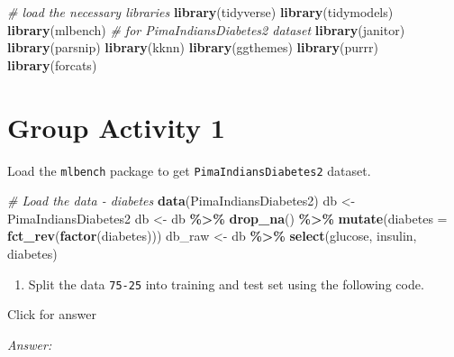 \documentclass[
]{book}
\newenvironment{Shaded}{\begin{snugshade}}{\end{snugshade}}
\newcommand{\AttributeTok}[1]{\textcolor[rgb]{0.13,0.29,0.53}{#1}}
\newcommand{\CommentTok}[1]{\textcolor[rgb]{0.56,0.35,0.01}{\textit{#1}}}
\newcommand{\FunctionTok}[1]{\textcolor[rgb]{0.13,0.29,0.53}{\textbf{#1}}}
\newcommand{\NormalTok}[1]{#1}
\newcommand{\OtherTok}[1]{\textcolor[rgb]{0.56,0.35,0.01}{#1}}
\newcommand{\SpecialCharTok}[1]{\textcolor[rgb]{0.81,0.36,0.00}{\textbf{#1}}}
\providecommand{\tightlist}{%
  \setlength{\itemsep}{0pt}\setlength{\parskip}{0pt}}
\begin{document}
\begin{Shaded}
\begin{Highlighting}[]
\CommentTok{\# load the necessary libraries}
\FunctionTok{library}\NormalTok{(tidyverse) }
\FunctionTok{library}\NormalTok{(tidymodels)}
\FunctionTok{library}\NormalTok{(mlbench)     }\CommentTok{\# for PimaIndiansDiabetes2 dataset}
\FunctionTok{library}\NormalTok{(janitor)}
\FunctionTok{library}\NormalTok{(parsnip)}
\FunctionTok{library}\NormalTok{(kknn)}
\FunctionTok{library}\NormalTok{(ggthemes)}
\FunctionTok{library}\NormalTok{(purrr)}
\FunctionTok{library}\NormalTok{(forcats)}
\end{Highlighting}
\end{Shaded}

\hypertarget{group-activity-1-7}{%
\section{Group Activity 1}\label{group-activity-1-7}}

Load the \texttt{mlbench} package to get \texttt{PimaIndiansDiabetes2} dataset.

\begin{Shaded}
\begin{Highlighting}[]
\CommentTok{\# Load the data {-} diabetes}
\FunctionTok{data}\NormalTok{(PimaIndiansDiabetes2)}
\NormalTok{db }\OtherTok{\textless{}{-}}\NormalTok{ PimaIndiansDiabetes2}
\NormalTok{db }\OtherTok{\textless{}{-}}\NormalTok{ db }\SpecialCharTok{\%\textgreater{}\%} \FunctionTok{drop\_na}\NormalTok{() }\SpecialCharTok{\%\textgreater{}\%} \FunctionTok{mutate}\NormalTok{(}\AttributeTok{diabetes =} \FunctionTok{fct\_rev}\NormalTok{(}\FunctionTok{factor}\NormalTok{(diabetes))) }
\NormalTok{db\_raw }\OtherTok{\textless{}{-}}\NormalTok{ db }\SpecialCharTok{\%\textgreater{}\%} \FunctionTok{select}\NormalTok{(glucose, insulin, diabetes)}
\end{Highlighting}
\end{Shaded}

\begin{enumerate}
\def\labelenumi{\alph{enumi}.}
\tightlist
\item
  Split the data \texttt{75-25} into training and test set using the following code.
\end{enumerate}

Click for answer

\emph{Answer:}
\end{document}
